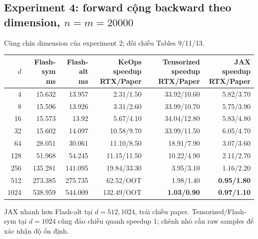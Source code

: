 \documentclass[11pt,a4paper]{article}
\begin{document}
\subsection{Experiment 4: forward cộng backward theo dimension, $n=m=20000$}
Cùng chín dimension của experiment 2; đối chiếu Tables 9/11/13.
\begin{center}\footnotesize
\setlength{\tabcolsep}{5pt}
\begin{tabular}{@{}rrrrrr@{}}
\toprule
$d$ & \shortstack{Flash-sym\\ms} & \shortstack{Flash-alt\\ms} & \shortstack{KeOps speedup\\RTX/Paper} & \shortstack{Tensorized speedup\\RTX/Paper} & \shortstack{JAX speedup\\RTX/Paper} \\
\midrule
4 & 15.632 & 13.957 & 2.31/1.50 & 33.92/10.60 & 5.82/3.70 \\
8 & 15.596 & 13.926 & 3.31/2.60 & 33.99/10.70 & 5.75/3.90 \\
16 & 15.573 & 13.92 & 5.67/4.10 & 34.04/12.80 & 5.83/4.80 \\
32 & 15.602 & 14.097 & 10.58/9.70 & 33.99/11.50 & 6.05/4.70 \\
64 & 28.051 & 30.061 & 11.10/8.50 & 18.91/7.90 & 3.07/3.60 \\
128 & 51.968 & 54.245 & 11.15/11.50 & 10.22/4.90 & 2.11/2.70 \\
256 & 135.281 & 141.095 & 19.84/33.30 & 3.95/3.10 & 1.16/2.20 \\
512 & 273.385 & 275.735 & 62.52/OOT & 1.98/1.40 & \textbf{0.95/1.80} \\
1024 & 538.959 & 544.009 & 132.49/OOT & \textbf{1.03/0.90} & \textbf{0.97/1.10} \\
\bottomrule
\end{tabular}
\end{center}
JAX nhanh hơn Flash-alt tại $d=512,1024$, trái chiều paper.
Tensorized/Flash-sym tại $d=1024$ cũng đảo chiều quanh speedup 1;
chênh nhỏ cần raw samples để xác nhận độ ổn định.
\end{document}
